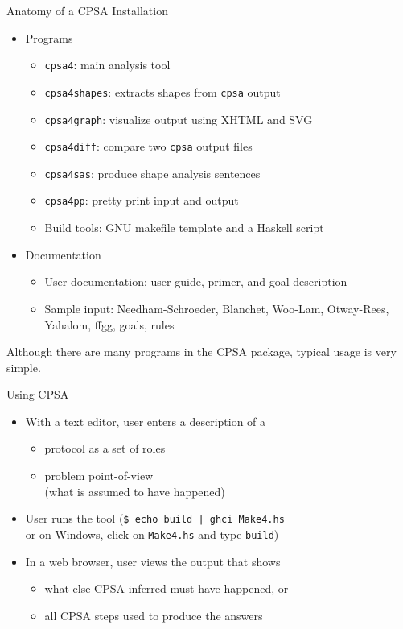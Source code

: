\documentclass[landscape]{slides}
\newcommand{\cpsa}{CPSA}
\newenvironment{zitemize}
{\begin{itemize}
\setlength{\itemsep}{0em}
\setlength{\topsep}{0em}
\setlength{\partopsep}{0em}
\setlength{\parsep}{0em}
\setlength{\parskip}{0em}}%
{\end{itemize}}
\begin{document}
\begin{mitreslide}{Anatomy of a CPSA Installation}
\begin{zitemize}
\item Programs
\begin{zitemize}
\item \texttt{cpsa4}: main analysis tool
\item \texttt{cpsa4shapes}: extracts shapes from \texttt{cpsa} output
\item \texttt{cpsa4graph}: visualize output using XHTML and SVG
\item \texttt{cpsa4diff}: compare two \texttt{cpsa} output files
\item \texttt{cpsa4sas}: produce shape analysis sentences
\item \texttt{cpsa4pp}: pretty print input and output
\item Build tools: GNU makefile template and a Haskell script
\end{zitemize}
\item Documentation
\begin{zitemize}
\item User documentation: user guide, primer, and goal description
\item Sample input: Needham-Schroeder, Blanchet, Woo-Lam, Otway-Rees,
  Yahalom, ffgg, goals, rules
\end{zitemize}
\end{zitemize}
\end{mitreslide}

\begin{note}
  Although there are many programs in the {\cpsa} package, typical
  usage is very simple.
\end{note}

\begin{mitreslide}{Using CPSA}
\begin{itemize}
\item With a text editor, user enters a description of a
\begin{zitemize}
\item protocol as a set of roles
\item problem point-of-view\\ (what is assumed to have happened)
\end{zitemize}
\item User runs the tool (\texttt{\$ echo build | ghci Make4.hs} \\
  or on Windows, click on \texttt{Make4.hs} and type \texttt{build})
\item In a web browser, user views the output that shows
\begin{zitemize}
\item what else CPSA inferred must have happened, or
\item all CPSA steps used to produce the answers
\end{zitemize}
\end{itemize}
\end{mitreslide}
\end{document}
